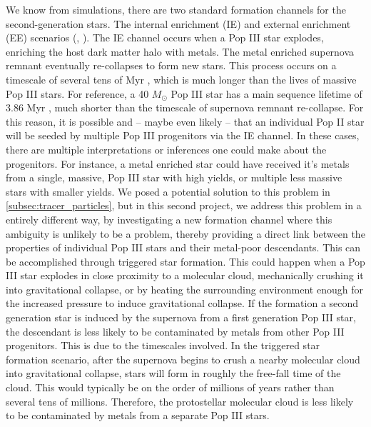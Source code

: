 \documentclass[12pt]{article}
\begin{document}
We know from simulations, there are two standard formation channels for the second-generation stars. The internal enrichment (IE) and external enrichment (EE) scenarios (\citet{Chiaki2019}, \citet{Smith2015}). The IE channel occurs when a Pop III star explodes, enriching the host dark matter halo with metals. The metal enriched supernova remnant eventually re-collapses to form new stars. This process occurs on a timescale of several tens of Myr \citep{Chiaki2019}, which is much longer than the lives of massive Pop III stars. For reference, a 40 $M_\odot$ Pop III star has a main sequence lifetime of 3.86 Myr \citep{Schaerer2002}, much shorter than the timescale of supernova remnant re-collapse. For this reason, it is possible and -- maybe even likely -- that an individual Pop II star will be seeded by multiple Pop III progenitors via the IE channel. In these cases, there are multiple interpretations or inferences one could make about the progenitors. For instance, a metal enriched star could have received it's metals from a single, massive, Pop III star with high yields, or multiple less massive stars with smaller yields. We posed a potential solution to this problem in \ref{subsec:tracer_particles}, but in this second project, we address this problem in a entirely different way, by investigating a new formation channel where this ambiguity is unlikely to be a problem, thereby providing a direct link between the properties of individual Pop III stars and their metal-poor descendants. This can be accomplished through triggered star formation. This could happen when a Pop III star explodes in close proximity to a molecular cloud, mechanically crushing it into gravitational collapse, or by heating the surrounding environment enough for the increased pressure to induce gravitational collapse. If the formation a second generation star is induced by the supernova from a first generation Pop III star, the descendant is less likely to be contaminated by metals from other Pop III progenitors. This is due to the timescales involved. In the triggered star formation scenario, after the supernova begins to crush a nearby molecular cloud into gravitational collapse, stars will form in roughly the free-fall time of the cloud. This would typically be on the order of millions of years rather than several tens of millions. Therefore, the protostellar molecular cloud is less likely to be contaminated by metals from a separate Pop III stars. 
\end{document}
